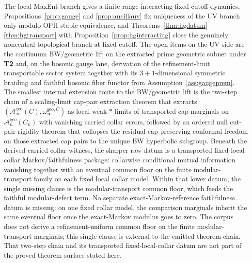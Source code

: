 \documentclass[11pt]{article}
\begin{document}
The local MaxEnt branch gives a finite-range interacting fixed-cutoff dynamics, Propositions~\ref{prop:gauge} and \ref{prop:ancillauv} fix uniqueness of the UV branch only modulo OPH-stable equivalence, and Theorems~\ref{thm:hgdatum}--\ref{thm:hgtransport} with Proposition~\ref{prop:hginteracting} close the genuinely noncentral topological branch at fixed cutoff. The open items on the UV side are the continuum BW/geometric lift on the extracted prime geometric subnet under \textbf{T2} and, on the bosonic gauge lane, derivation of the refinement-limit transportable sector system together with its \(3+1\)-dimensional symmetric braiding and faithful bosonic fiber functor from Assumption~\ref{ass:gaugeprem}. The smallest internal extension route to the BW/geometric lift is the two-step chain of a scaling-limit cap-pair extraction theorem that extracts \((\mathcal A_\infty^{\mathrm{geo}}(C),\omega_\infty^{\mathrm{geo},C})\) as local weak-\(*\) limits of transported cap marginals on \(\mathcal A_n^{\mathrm{geo}}(C_n)\) with vanishing carried collar errors, followed by an ordered null cut-pair rigidity theorem that collapses the residual cap-preserving conformal freedom on those extracted cap pairs to the unique BW hyperbolic subgroup. Beneath the derived carried-collar witness, the sharper raw datum is a transported fixed-local-collar Markov/faithfulness package: collarwise conditional mutual information vanishing together with an eventual common floor on the finite modular-transport family on each fixed local collar model. Within that lower datum, the single missing clause is the modular-transport common floor, which feeds the faithful modular-defect term. No separate exact-Markov-reference faithfulness datum is missing: on one fixed collar model, the comparison marginals inherit the same eventual floor once the exact-Markov modulus goes to zero. The corpus does not derive a refinement-uniform common floor on the finite modular-transport marginals; this single clause is external to the emitted theorem chain. That two-step chain and its transported fixed-local-collar datum are not part of the proved theorem surface stated here.
\end{document}
